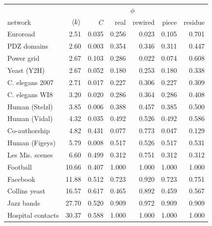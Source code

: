 \begin{tabular}{lrrrrrr}
\hline\hline
 & & & \multicolumn{2}{c}{$\phi$} & & \\
network & $\langle k \rangle$ & $C$ & real & rewired & piece & residue\\
\hline
Euroroad & 2.51 & 0.035 & 0.256 & 0.023 & 0.105 & 0.701\\
PDZ domains & 2.60 & 0.003 & 0.354 & 0.346 & 0.311 & 0.447\\
Power grid & 2.67 & 0.103 & 0.286 & 0.022 & 0.074 & 0.608\\
Yeast (Y2H) & 2.67 & 0.052 & 0.180 & 0.253 & 0.180 & 0.338\\
C. elegans 2007 & 2.71 & 0.017 & 0.227 & 0.306 & 0.227 & 0.309\\
C. elegans WI8 & 3.20 & 0.020 & 0.286 & 0.364 & 0.286 & 0.408\\
Human (Stelzl) & 3.85 & 0.006 & 0.388 & 0.457 & 0.385 & 0.500\\
Human (Vidal) & 4.32 & 0.035 & 0.492 & 0.526 & 0.492 & 0.586\\
Co-authorship & 4.82 & 0.431 & 0.077 & 0.773 & 0.047 & 0.129\\
Human (Figeys) & 5.79 & 0.008 & 0.517 & 0.526 & 0.517 & 0.531\\
Les Mis. scenes & 6.60 & 0.499 & 0.312 & 0.751 & 0.312 & 0.312\\
Football & 10.66 & 0.407 & 1.000 & 1.000 & 1.000 & 1.000\\
Facebook & 11.88 & 0.512 & 0.723 & 0.920 & 0.723 & 0.751\\
Collins yeast & 16.57 & 0.617 & 0.465 & 0.892 & 0.459 & 0.567\\
Jazz bands & 27.70 & 0.520 & 0.909 & 0.972 & 0.909 & 0.909\\
Hospital contacts & 30.37 & 0.588 & 1.000 & 1.000 & 1.000 & 1.000\\
\hline\hline
\end{tabular}
